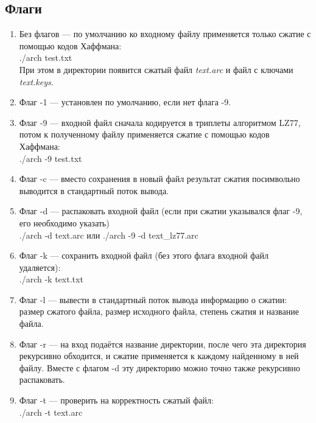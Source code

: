\documentclass[12pt]{article}
\begin{document}
    \subsection*{Флаги}
    \begin{enumerate}
        \item Без флагов — по умолчанию ко входному файлу применяется только 
        сжатие с помощью кодов Хаффмана: \\
        ./arch test.txt \\
        При этом в директории появится сжатый файл \textit{text.arc} и 
        файл с ключами \textit{text.keys}.

        \item Флаг -1 — установлен по умолчанию, если нет флага -9.

        \item Флаг -9 — входной файл сначала кодируется в триплеты алгоритмом 
        LZ77, потом к полученному файлу применяется сжатие с помощью кодов 
        Хаффмана: \\
        ./arch -9 test.txt
        \item Флаг -c — вместо сохранения в новый файл результат сжатия 
        посимвольно выводится в стандартный поток вывода.

        \item Флаг -d — распаковать входной файл (если при сжатии указывался флаг -9, его необходимо указать) \\
        ./arch -d text.arc или ./arch -9 -d text\_lz77.arc

        \item Флаг -k — сохранить входной файл (без этого флага входной файл 
        удаляется): \\
        ./arch -k text.txt \\

        \item Флаг -l — вывести в стандартный поток вывода информацию о 
        сжатии: размер сжатого файла, размер исходного файла, степень сжатия и название файла.

        \item Флаг -r — на вход подаётся название директории, после чего эта 
        директория рекурсивно обходится, и сжатие применяется к каждому 
        найденному в ней файлу. Вместе с флагом -d эту директорию можно точно также рекурсивно распаковать.

        \item Флаг -t — проверить на корректность сжатый файл: \\
         ./arch -t text.arc
    \end{enumerate}
\end{document}
